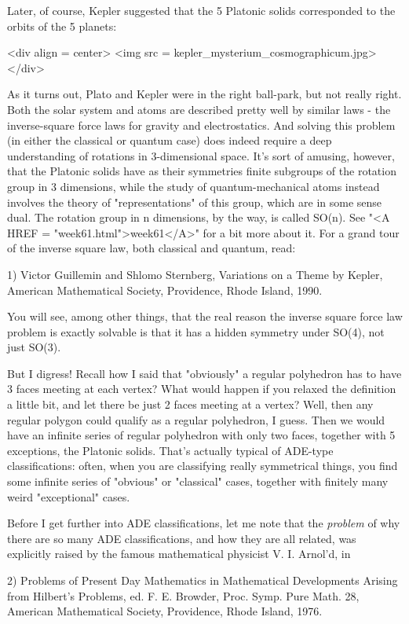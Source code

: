 Later, of course, Kepler suggested that the 5 Platonic solids
corresponded to the orbits of the 5 planets:

<div align = center>
<img src = kepler_mysterium_cosmographicum.jpg>
</div>

As it turns out, Plato
and Kepler were in the right ball-park, but not really right.  Both
the solar system and atoms are described pretty well by similar laws -
the inverse-square force laws for gravity and electrostatics. And
solving this problem (in either the classical or quantum case) does
indeed require a deep understanding of rotations in 3-dimensional
space.  It's sort of amusing, however, that the Platonic solids have
as their symmetries finite subgroups of the rotation group in 3
dimensions, while the study of quantum-mechanical atoms instead
involves the theory of "representations" of this group,
which are in some sense dual.  The rotation group in n dimensions, by
the way, is called SO(n).  See "<A HREF =
"week61.html">week61</A>" for a bit more about it.  For
a grand tour of the inverse square law, both classical and quantum,
read:

1) Victor Guillemin and Shlomo Sternberg, Variations on a Theme
by Kepler, American Mathematical Society, Providence, Rhode Island,
1990.

You will see, among other things, that the real reason the inverse
square force law problem is exactly solvable is that it has a hidden
symmetry under SO(4), not just SO(3).  

But I digress!  Recall how I said that "obviously" a regular
polyhedron has to have 3 faces meeting at each vertex?  What would
happen if you relaxed the definition a little bit, and let there be
just 2 faces meeting at a vertex?  Well, then any regular polygon
could qualify as a regular polyhedron, I guess.  Then we would have an
infinite series of regular polyhedron with only two faces, together
with 5 exceptions, the Platonic solids.  That's actually typical of
ADE-type classifications: often, when you are classifying really
symmetrical things, you find some infinite series of
"obvious" or "classical" cases, together with
finitely many weird "exceptional" cases.

Before I get further into ADE classifications, let me note that
the \emph{problem} of why there are so many ADE classifications, and
how they are all related, was explicitly raised by the famous
mathematical physicist V. I. Arnol'd, in 

2) Problems of Present Day Mathematics in Mathematical Developments
Arising from Hilbert's Problems, ed. F. E. Browder, Proc. Symp.
Pure Math. 28, American Mathematical Society, Providence, Rhode
Island, 1976.

